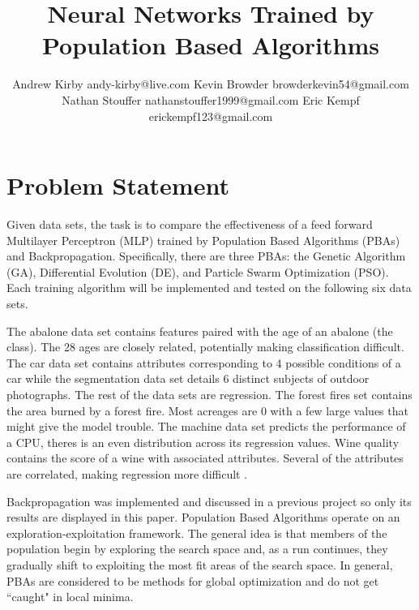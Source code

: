 \documentclass[twoside,11pt]{article}
\begin{document}
\title{Neural Networks Trained by Population Based Algorithms}

\author{\name Andrew Kirby \email andy-kirby@live.com \AND
		\name Kevin Browder \email browderkevin54@gmail.com \AND
		\name Nathan Stouffer \email nathanstouffer1999@gmail.com \AND
		\name Eric Kempf \email erickempf123@gmail.com }

\maketitle

\begin{abstract}

\end{abstract}

\section{Problem Statement}

	Given data sets, the task is to compare the effectiveness of a feed forward Multilayer Perceptron (MLP) trained by Population Based Algorithms (PBAs) and Backpropagation. Specifically, there are three PBAs: the Genetic Algorithm (GA), Differential Evolution (DE), and Particle Swarm Optimization (PSO).
	Each training algorithm will be implemented and tested on the following six data sets.

	The abalone data set contains features paired with the age of an abalone (the class). The 28 ages are closely related, potentially making classification difficult.
	The car data set contains attributes corresponding to 4 possible conditions of a car while the segmentation data set details 6 distinct subjects of outdoor photographs.
	The rest of the data sets are regression.
	The forest fires set contains the area burned by a forest fire. Most acreages are 0 with a few large values that might give the model trouble.
	The machine data set predicts the performance of a CPU, theres is an even distribution across its regression values.
	Wine quality contains the score of a wine with associated attributes. Several of the attributes are correlated, making regression more difficult \citep{datasets}.

	Backpropagation was implemented and discussed in a previous project so only its results are displayed in this paper. Population Based Algorithms operate on an exploration-exploitation framework.
	The general idea is that members of the population begin by exploring the search space and, as a run continues, they gradually shift to exploiting the most fit areas of the search space. 
	In general, PBAs are considered to be methods for global optimization and do not get ``caught" in local minima.
\end{document}
